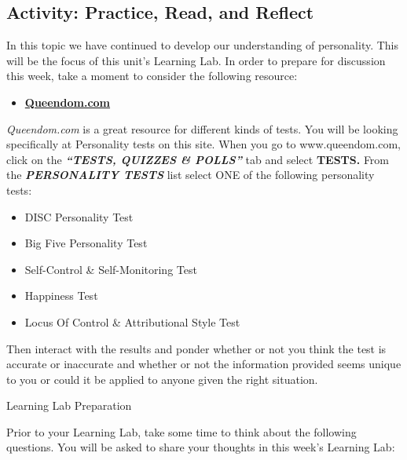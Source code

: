 \documentclass[
]{book}
\providecommand{\tightlist}{%
  \setlength{\itemsep}{0pt}\setlength{\parskip}{0pt}}
\begin{document}
\hypertarget{activity-practice-read-and-reflect}{%
\subsection*{Activity: Practice, Read, and Reflect}\label{activity-practice-read-and-reflect}}

\begin{reflect}
In this topic we have continued to develop our understanding of personality. This will be the focus of this unit's Learning Lab. In order to prepare for discussion this week, take a moment to consider the following resource:

\begin{itemize}
\tightlist
\item
  \href{https://www.queendom.com/}{\textbf{Queendom.com}}
\end{itemize}

\emph{Queendom.com} is a great resource for different kinds of tests. You will be looking specifically at Personality tests on this site. When you go to www.queendom.com, click on the \textbf{\emph{``TESTS, QUIZZES \& POLLS''}} tab and select \textbf{TESTS.} From the \textbf{\emph{PERSONALITY TESTS}} list select ONE of the following personality tests:

\begin{itemize}
\tightlist
\item
  DISC Personality Test\\
\item
  Big Five Personality Test\\
\item
  Self-Control \& Self-Monitoring Test\\
\item
  Happiness Test\\
\item
  Locus Of Control \& Attributional Style Test
\end{itemize}

Then interact with the results and ponder whether or not you think the test is accurate or inaccurate and whether or not the information provided seems unique to you or could it be applied to anyone given the right situation.

{Learning Lab Preparation}

Prior to your Learning Lab, take some time to think about the following questions.
You will be asked to share your thoughts in this week's Learning Lab:


\end{reflect}
\end{document}
